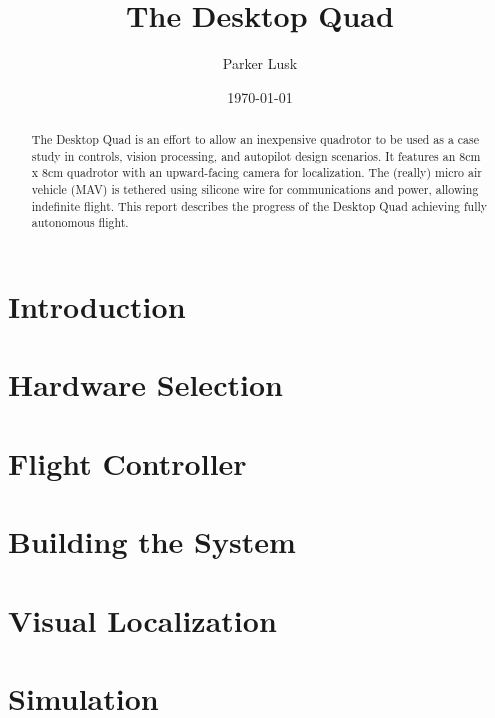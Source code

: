 \documentclass[dvips,12pt]{article}
\begin{document}
\title{\LARGE The Desktop Quad }
\author{Parker Lusk}
\date{\today}
\maketitle

\begin{abstract}
	The Desktop Quad is an effort to allow an inexpensive quadrotor to be used as a case study in controls, vision processing, and autopilot design scenarios. It features an 8cm x 8cm quadrotor with an upward-facing camera for localization. The (really) micro air vehicle (MAV) is tethered using silicone wire for communications and power, allowing indefinite flight. This report describes the progress of the Desktop Quad achieving fully autonomous flight.
\end{abstract}

\doublespacing
\section{Introduction}

\section{Hardware Selection}

\section{Flight Controller}

\section{Building the System}

\section{Visual Localization}

\section{Simulation}
\end{document}

